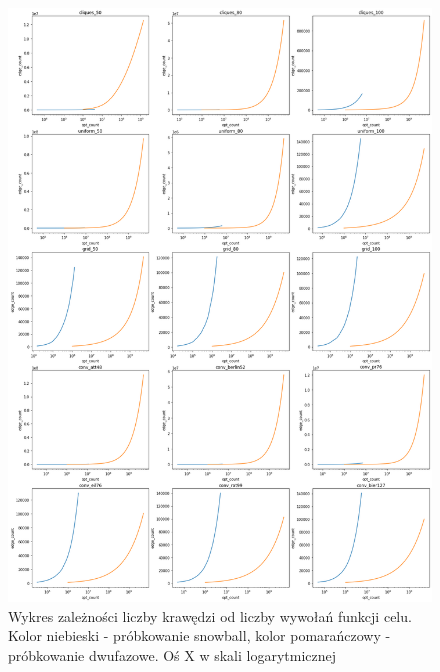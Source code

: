 \begin{figure}[h!]
    \centering
    \includegraphics[width=\textwidth]{chapters/experiments/img/opt_edges.png}
    \caption{Wykres zależności liczby krawędzi od liczby wywołań funkcji celu.
        Kolor niebieski - próbkowanie snowball, kolor pomarańczowy - próbkowanie dwufazowe.
        Oś X w skali logarytmicznej}
    \label{fig:main_opt_edges}
\end{figure}


